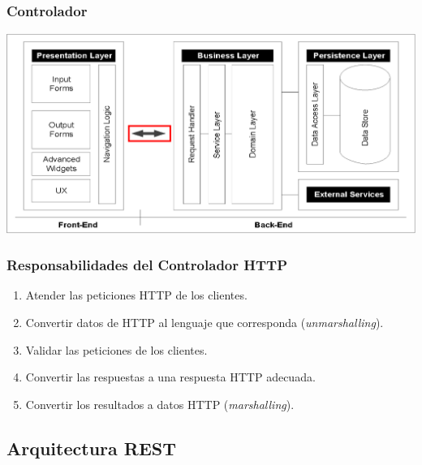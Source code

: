 \documentclass[a4paper,slidestop,xcolor=pst,blue]{beamer}
\begin{document}
\begin{frame}
    \frametitle{Controlador}
    \begin{center}
        \includegraphics[width=\linewidth]{images/http/enterpriseArchitectures02.eps}
    \end{center}
\end{frame}

\begin{frame}[c]
	\frametitle{Responsabilidades del Controlador HTTP}
	\begin{enumerate}[<+->]
        \item Atender las peticiones HTTP de los clientes.
        \item Convertir datos de HTTP al lenguaje que corresponda (\emph{unmarshalling}).
        \item Validar las peticiones de los clientes.
        \item Convertir las respuestas a una respuesta HTTP adecuada.
        \item Convertir los resultados a datos HTTP (\emph{marshalling}).
	\end{enumerate}
\end{frame}

\subsection{Arquitectura REST}
\end{document}
